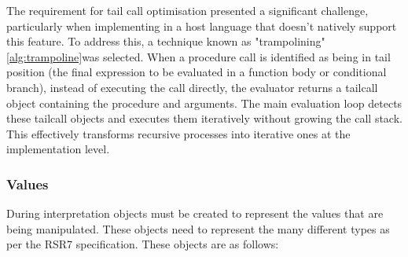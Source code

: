 \documentclass[final]{cmpreport_02}
\begin{document}
The requirement for tail call optimisation presented a significant challenge, particularly when implementing in a host language that doesn't natively support this feature. To address this, a technique known as "trampolining" \ref{alg:trampoline}was selected. When a procedure call is identified as being in tail position (the final expression to be evaluated in a function body or conditional branch), instead of executing the call directly, the evaluator returns a tailcall object containing the procedure and arguments. The main evaluation loop detects these tailcall objects and executes them iteratively without growing the call stack. This effectively transforms recursive processes into iterative ones at the implementation level.

\subsubsection{Values}
During interpretation objects must be created to represent the values that are being manipulated. These objects need to represent the many different types as per the RSR7 specification. These objects are as follows:
\end{document}
